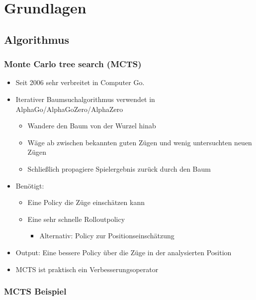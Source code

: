 \section{Grundlagen}




\subsection{Algorithmus}



\begin{frame}
 \frametitle{Monte Carlo tree search (MCTS)}
  


\begin{itemize}
  \item \pause Seit 2006 sehr verbreitet in Computer Go.
  \item \pause Iterativer Baumsuchalgorithmus verwendet in AlphaGo/AlphaGoZero/AlphaZero
\begin{itemize}
  \item \pause Wandere den Baum von der Wurzel hinab
  \item \pause Wäge ab zwischen bekannten guten Zügen und wenig untersuchten neuen Zügen
  \item \pause Schließlich propagiere Spielergebnis zurück durch den Baum
\end{itemize}
  \item \pause Benötigt:
\begin{itemize}
  \item \pause Eine Policy die Züge einschätzen kann
  \item \pause Eine sehr schnelle Rolloutpolicy
\begin{itemize}
  \item \pause Alternativ: Policy zur Positionseinschätzung
\end{itemize}
\end{itemize}
  \item \pause Output: Eine bessere Policy über die Züge in der analysierten Position
  \item \pause MCTS ist praktisch ein Verbesserungsoperator
\end{itemize}

  
\end{frame}
\begin{frame}
 \frametitle{MCTS Beispiel}
  




  
\end{frame}
